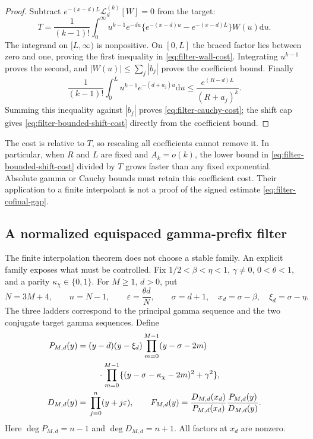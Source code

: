 \documentclass[11pt]{article}
\theoremstyle{definition}
\theoremstyle{remark}
\newcommand{\dd}{\mathrm d}
\begin{document}
\begin{proof}
Subtract $e^{-(x-d)L}\mathcal L_d^{(k)}[W]=0$ from the target:
\[
 T=\frac1{(k-1)!}\int_0^\infty
 u^{k-1}e^{-du}\{e^{-(x-d)u}-e^{-(x-d)L}\}W(u)\dd u.
\]
The integrand on $[L,\infty)$ is nonpositive.  On $[0,L]$ the
braced factor lies between zero and one, proving the first inequality
in \eqref{eq:filter-wall-cost}.  Integrating $u^{k-1}$ proves the
second, and $|W(u)|\le\sum_j|b_j|$ proves the coefficient bound.
Finally
\[
 \frac1{(k-1)!}\int_0^L u^{k-1}e^{-(d+a_j)u}\dd u
 \le \frac{e^{(R-d)L}}{(R+a_j)^k}.
\]
Summing this inequality against $|b_j|$ proves
\eqref{eq:filter-cauchy-cost}; the shift cap gives
\eqref{eq:filter-bounded-shift-cost} directly from the coefficient bound.
\end{proof}

The cost is relative to $T$, so rescaling all coefficients cannot
remove it.  In particular, when $R$ and $L$ are fixed and $A_k=o(k)$,
the lower bound in \eqref{eq:filter-bounded-shift-cost} divided by $T$
grows faster than any fixed exponential.  Absolute gamma or Cauchy
bounds must retain this coefficient cost.  Their application to a
finite interpolant is not a proof of the signed estimate
\eqref{eq:filter-cofinal-gap}.

\subsection{A normalized equispaced gamma-prefix filter}
\label{subsec:filter-equispaced}

The finite interpolation theorem does not choose a stable family.
An explicit family exposes what must be controlled.  Fix
$1/2<\beta<\eta<1$, $\gamma\ne0$, $0<\theta<1$, and a parity
$\kappa_\chi\in\{0,1\}$.  For $M\ge1$, $d>0$, put
\begin{equation}
 N=3M+4,\qquad n=N-1,\qquad
 \varepsilon=\frac{\theta d}{N},\qquad
 \sigma=d+1,\quad x_d=\sigma-\beta,\quad\xi_d=\sigma-\eta.
 \label{eq:filter-equispaced-parameters}
\end{equation}
The three ladders correspond to the principal gamma sequence and the
two conjugate target gamma sequences.  Define
\begin{equation}
 \begin{split}
 P_{M,d}(y)={}&(y-d)(y-\xi_d)
 \prod_{m=0}^{M-1}(y-\sigma-2m)\\
 &\hspace{4mm}\cdot\prod_{m=0}^{M-1}
       \{(y-\sigma-\kappa_\chi-2m)^2+\gamma^2\},\\
 D_{M,d}(y)={}&\prod_{j=0}^{n}(y+j\varepsilon),\qquad
 F_{M,d}(y)=\frac{D_{M,d}(x_d)}{P_{M,d}(x_d)}
                     \frac{P_{M,d}(y)}{D_{M,d}(y)}.
 \end{split}
 \label{eq:filter-equispaced-rational}
\end{equation}
Here $\deg P_{M,d}=n-1$ and $\deg D_{M,d}=n+1$.
All factors at $x_d$ are nonzero.
\end{document}
